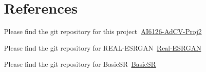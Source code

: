 \documentclass{article}
\begin{document}
% 
% 
% 
% 

\section{References}

\noindent Please find the git repository for this project~\href{https://github.com/Riemer1818/AI6126-AdCV-Proj2}{AI6126-AdCV-Proj2}

\noindent Please find the git repository for REAL-ESRGAN~\href{https://github.com/xinntao/Real-ESRGAN}{Real-ESRGAN}

\noindent  Please find the git repository for BasicSR~\href{https://github.com/XPixelGroup/BasicSR}{BasicSR}
\end{document}
